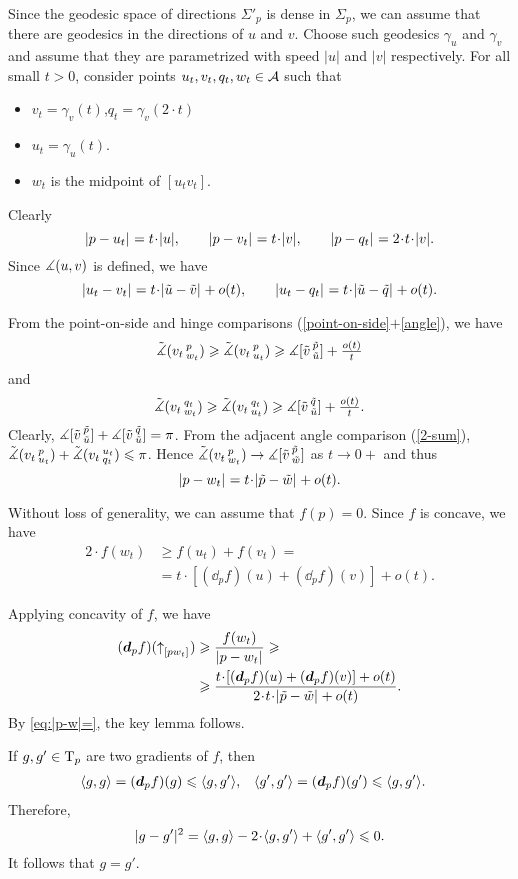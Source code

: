 Since the geodesic space of directions $\Sigma'_p$ is dense in $\Sigma_p$,
we can assume that there are geodesics in the directions of $u$ and $v$.
Choose such geodesics $\gamma_u$ and $\gamma_v$ and assume that they are parametrized with speed $|u|$ and $|v|$ respectively.
For all small $t>0$, consider points $u_t,v_t,q_t,w_t\in \mathcal{A}$ such that
\begin{itemize}
\item $v_t=\gamma_v(t)$,\quad  $q_t=\gamma_v(2\cdot t)$
\item $u_t=\gamma_u(t)$.
\item $w_t$ is the midpoint of $[u_t v_t]$.
\end{itemize}
Clearly 
\[\dist{p}{u_t}{}=t\cdot |u|,\qquad \dist{p}{v_t}{}=t\cdot|v|,\qquad \dist{p}{q_t}{}=2\cdot t\cdot|v|.\] 
Since $\measuredangle(u,v)$ is defined, 
we have 
\[\dist{u_t}{v_t}{}=t\cdot\dist{\tilde u}{\tilde v}{}+o(t),
\qquad
\dist{u_t}{q_t}{}=t\cdot\dist{\tilde u}{\tilde q}{}+o(t).\]

From the point-on-side and hinge comparisons (\ref{point-on-side}$+$\ref{angle}), we have
\[\tilde\measuredangle(v_t\,{}^{p}_{w_t})
\geqslant
\tilde\measuredangle(v_t\,{}^{p}_{u_t})
\geqslant
\measuredangle[\tilde v\,{}^{\tilde p}_{\tilde u}]+\tfrac{o(t)}t\]
and
\[\tilde\measuredangle(v_t\,{}^{q_t}_{w_t})
\geqslant
\tilde\measuredangle(v_t\,{}^{q_t}_{u_t})
\geqslant
\measuredangle[\tilde v\,{}^{\tilde q}_{\tilde u}]+\tfrac{o(t)}t.\]
Clearly, 
$\measuredangle[\tilde v\,{}^{\tilde p}_{\tilde u}]+\measuredangle[\tilde v\,{}^{\tilde q}_{\tilde u}]=\pi$. 
From the adjacent angle comparison (\ref{2-sum}), 
$\tilde\measuredangle(v_t\,{}^{p}_{u_t})+\tilde\measuredangle(v_t\,{}^{u_t}_{q_t})\leqslant \pi$.
Hence
$\tilde\measuredangle(v_t\,{}^{p}_{w_t})
\to
\measuredangle[\tilde v\,{}^{\tilde p}_{\tilde w}]$ as $t\to0+$
and thus 
\[\dist{p}{w_t}{}=t\cdot\dist{\tilde p}{\tilde w}{}+o(t).\]

Without loss of generality, we can assume that $f(p)=0$.
Since $f$ is concave, we have 
\begin{align*}
2\cdot f(w_t)&\ge f(u_t)+f(v_t)=
\\
&=t\cdot [(\dd_p f)(u)+(\dd_p f)(v)]+o(t).
\end{align*}
 
Applying concavity of $f$, we have
\begin{align*}
(\dd_p f)(\dir p{w_t})
&\ge 
\frac{f(w_t)}{\dist{p}{w_t}{}}
\ge 
\\
&\ge
\frac{t\cdot[(\dd_p f)(u)+(\dd_p f)(v)]+o(t)}{2\cdot t\cdot\dist{\tilde p}{\tilde w}{}+o(t)}.
\end{align*}
By \ref{eq:|p-w|=}, the key lemma follows.
\qeds

If $g,g'\in \mathrm{T}_p$ are two gradients of $f$,
then 
\begin{align*}
\langle g,g\rangle
&=(\bm{d}_p f)(g)\leqslant \langle g,g'\rangle,
&
\langle g',g'\rangle
&=(\bm{d}_p f)(g')\leqslant \langle g,g'\rangle.
\end{align*}
Therefore,
\[\dist[2]{g}{g'}{}=\<g,g\>-2\cdot\<g,g'\>+\<g',g'\>\le0.\] 
It follows that $g=g'$.

